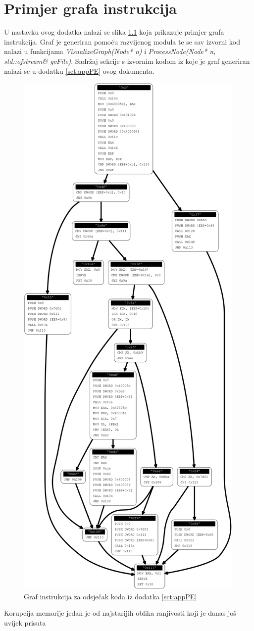 \documentclass[times, utf8, diplomski, numeric]{fer}
\begin{document}
\chapter{Primjer grafa instrukcija}
\label{sct:appGraph}

U nastavku ovog dodatka nalazi se slika \ref{fig:appGraphInstr}
koja prikazuje primjer grafa instrukcija. Graf je generiran
pomoću razvijenog modula te se sav izvorni kod nalazi u
funkcijama \emph{VisualizeGraph(Node* n)} i
\emph{ProcessNode(Node* n, std::ofstream\& gvFile)}. Sadržaj
sekcije s izvornim kodom iz koje je graf generiran nalazi se u
dodatku \ref{sct:appPE} ovog dokumenta.

\begin{figure}[htb]
\centering
\setlength\fboxsep{0pt}
\setlength\fboxrule{0.5pt}
\includegraphics[width=\textwidth, height=\textheight]{slike/AD_CM1_graph}
\caption{Graf instrukcija za odsječak koda iz dodatka \ref{sct:appPE}}
\label{fig:appGraphInstr} 
\end{figure}
\clearpage

\begin{sazetak}
Korupcija memorije jedan je od najstarijih oblika ranjivosti koji
je danas još uvijek prisuta
\end{sazetak}
\end{document}
